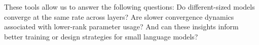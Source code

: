 These tools allow us to answer the following questions: Do different-sized models converge at the same rate across layers? Are slower convergence dynamics associated with lower-rank parameter usage? And can these insights inform better training or design strategies for small language models?









